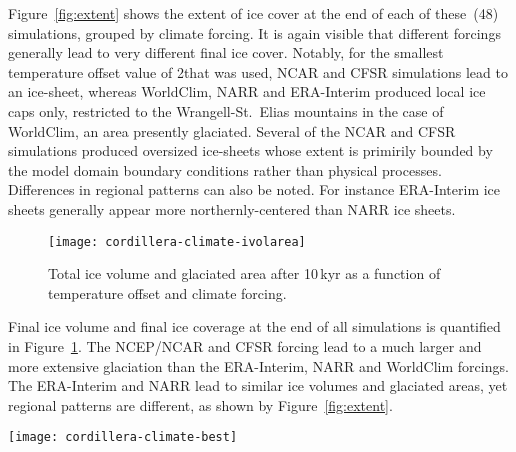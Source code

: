 Figure~\ref{fig:extent} shows the extent of ice cover at the end of each of these~(48) simulations, grouped by climate forcing. It is again visible that different forcings generally lead to very different final ice cover. Notably, for the smallest temperature offset value of 2\degC that was used, NCAR and CFSR simulations lead to an ice-sheet, whereas WorldClim, NARR and ERA-Interim produced local ice caps only, restricted to the Wrangell-St.~Elias mountains in the case of WorldClim, an area presently glaciated. Several of the NCAR and CFSR simulations produced oversized ice-sheets whose extent is primirily bounded by the model domain boundary conditions rather than physical processes. Differences in regional patterns can also be noted. For instance ERA-Interim ice sheets generally appear more northernly-centered than NARR ice sheets.

\begin{figure}[t]
	\vspace*{2mm}
	\begin{center}
		\texttt{[image: cordillera-climate-ivolarea]}
	\end{center}
	\caption{Total ice volume and glaciated area after 10\,kyr as a function of temperature offset and climate forcing.}
	\label{fig:ivolarea}
\end{figure}

Final ice volume and final ice coverage at the end of all simulations is quantified in Figure~\ref{fig:ivolarea}. The NCEP/NCAR and CFSR forcing lead to a much larger and more extensive glaciation than the ERA-Interim, NARR and WorldClim forcings. The ERA-Interim and NARR lead to similar ice volumes and glaciated areas, yet regional patterns are different, as shown by Figure~\ref{fig:extent}.

\begin{figure*}[t]
	\vspace*{2mm}
	\begin{center}
		\texttt{[image: cordillera-climate-best]}
	\end{center}
	\caption{Ice surface topography (black contours every 1000\,m) and velocity (\unit{m\,yr^{-1}}) after 10\,kyr using temperature offsets that lead to similar areas of ice cover for each climate forcing. 14\,$^{14}$C\,ka\,BP (16.8\,cal\,ka\,BP) ice margin from \citet{dyke-2004}.}
	\label{fig:best}
\end{figure*}

